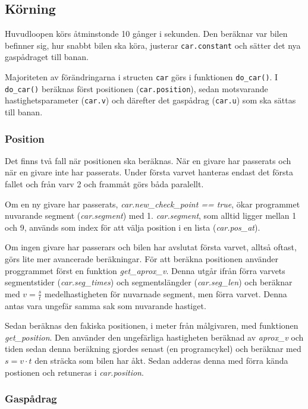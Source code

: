 \subsection{Körning}

Huvudloopen körs åtminstonde 10 gånger i sekunden. Den beräknar var bilen
befinner sig, hur snabbt bilen ska köra, justerar \texttt{car.constant} och sätter det
nya gaspådraget till banan.

Majoriteten av förändringarna i structen \texttt{car} görs i funktionen \texttt{do\_car()}. 
I \texttt{do\_car()} beräknas  först positionen (\texttt{car.position}), 
sedan motsvarande hastighetsparameter (\texttt{car.v}) och därefter det gaspådrag 
(\texttt{car.u}) som ska sättas till banan.

\subsubsection{Position}

Det finns två fall när positionen ska beräknas. När en givare har passerats och
när en givare inte har passerats. Under första varvet hanteras endast det första fallet
och från varv 2 och frammåt görs båda paralellt. 

Om en ny givare har passerats, \emph{car.new\_check\_point == true}, ökar
programmet nuvarande segment (\emph{car.segment}) med 1. \emph{car.segment}, som
alltid ligger mellan 1 och 9, används som index för att välja position i en
lista (\emph{car.pos\_at}). 

Om ingen givare har passerars och bilen har avslutat första varvet, alltså
oftast, görs lite mer avancerade beräkningar. För att beräkna positionen
använder proggrammet först en funktion \emph{get\_aprox\_v}. Denna utgår ifrån
förra varvets segmentstider (\emph{car.seg\_times}) och segmentslängder
(\emph{car.seg\_len}) och beräknar med $v = \frac{s}{t}$ medelhastigheten för nuvarnade
segment, men förra varvet. Denna antas vara ungefär samma sak som nuvarande
hastiget. 

Sedan beräknas den fakiska positionen, i meter från målgivaren, med funktionen
\emph{get\_position}. Den använder den ungefärliga hastigheten beräknad av
\emph{aprox\_v} och tiden sedan denna beräkning gjordes senast (en programcykel)
och beräknar med $s = v \cdot t$ den sträcka som bilen har åkt. Sedan adderas denna
med förra kända postionen och retuneras i \emph{car.position}. 

\subsubsection{Gaspådrag}

